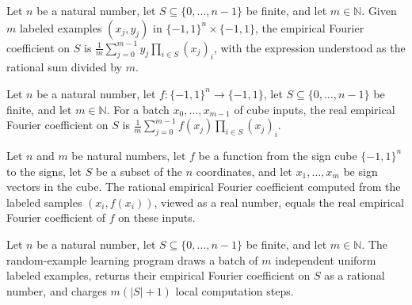 \begin{definition}
\label{FABL.empiricalFourierCoeff}
\leanok
{}
Let $n$ be a natural number, let $S\subseteq\{0,\ldots,n-1\}$ be finite, and let
$m\in\mathbb N$. Given $m$ labeled examples $(x_j,y_j)$ in $\{−1,1\}^n\times\{−1,1\}$,
the empirical Fourier coefficient on $S$ is $\frac{1}{m}\sum_{j=0}^{m-1} y_j\prod_{i\in
S}(x_j)_i$, with the expression understood as the rational sum divided by $m$.
\end{definition}

\begin{definition}
\label{FABL.realEmpiricalFourierCoeff}
\leanok
{}
Let $n$ be a natural number, let $f:\{−1,1\}^n\to\{−1,1\}$, let
$S\subseteq\{0,\ldots,n-1\}$ be finite, and let $m\in\mathbb N$. For a batch
$x_0,\ldots,x_{m-1}$ of cube inputs, the real empirical Fourier coefficient on $S$ is
$\frac{1}{m}\sum_{j=0}^{m-1} f(x_j)\prod_{i\in S}(x_j)_i$.
\end{definition}

\begin{theorem}
\label{FABL.empiricalFourierCoeff_cast}
\leanok
{}
Let $n$ and $m$ be natural numbers, let $f$ be a function from the sign cube
$\{-1,1\}^n$ to the signs, let $S$ be a subset of the $n$ coordinates, and let
$x_1,\ldots,x_m$ be sign vectors in the cube. The rational empirical Fourier coefficient
computed from the labeled samples $(x_i,f(x_i))$, viewed as a real number, equals the
real empirical Fourier coefficient of $f$ on these inputs.
\end{theorem}

\begin{definition}
\label{FABL.fourierCoeffEstimatorProgram}
\leanok
{}
Let $n$ be a natural number, let $S\subseteq\{0,\ldots,n-1\}$ be finite, and let
$m\in\mathbb N$. The random-example learning program draws a batch of $m$ independent
uniform labeled examples, returns their empirical Fourier coefficient on $S$ as a
rational number, and charges $m(|S|+1)$ local computation steps.
\end{definition}

